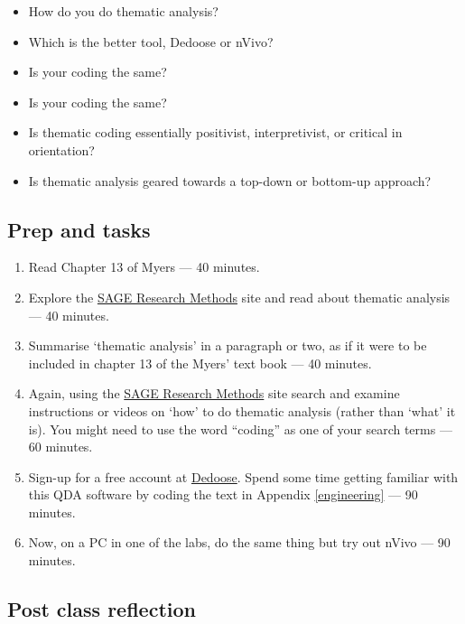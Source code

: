 \documentclass[]{book}
\theoremstyle{definition}
\theoremstyle{definition}
\theoremstyle{definition}
\theoremstyle{remark}
\begin{document}
\begin{itemize}
\item
  How do you do thematic analysis?
\item
  Which is the better tool, Dedoose or nVivo?
\item
  Is your coding the same?
\item
  Is your coding the same?
\item
  Is thematic coding essentially positivist, interpretivist, or critical
  in orientation?
\item
  Is thematic analysis geared towards a top-down or bottom-up approach?
\end{itemize}

\hypertarget{prep-and-tasks-5}{%
\subsection*{Prep and tasks}\label{prep-and-tasks-5}}

\begin{enumerate}
\def\labelenumi{\arabic{enumi}.}
\item
  Read Chapter 13 of Myers \autocite*[
  p.~165--181]{myers_2013_qualitativeresearchbusiness} --- 40 minutes.
\item
  Explore the
  \href{http://methods.sagepub.com.ezproxy.auckland.ac.nz/}{SAGE
  Research Methods} site and read about thematic analysis --- 40
  minutes.
\item
  Summarise `thematic analysis' in a paragraph or two, as if it were to
  be included in chapter 13 of the Myers' text book --- 40 minutes.
\item
  Again, using the
  \href{http://methods.sagepub.com.ezproxy.auckland.ac.nz/}{SAGE
  Research Methods} site search and examine instructions or videos on
  `how' to do thematic analysis (rather than `what' it is). You might
  need to use the word ``coding'' as one of your search terms --- 60
  minutes.
\item
  Sign-up for a free account at \href{http://dedoose.com}{Dedoose}.
  Spend some time getting familiar with this QDA software by coding the
  text in Appendix \ref{engineering} --- 90 minutes.
\item
  Now, on a PC in one of the labs, do the same thing but try out nVivo
  --- 90 minutes.
\end{enumerate}

\hypertarget{post-class-reflection-5}{%
\subsection*{Post class reflection}\label{post-class-reflection-5}}
\end{document}
